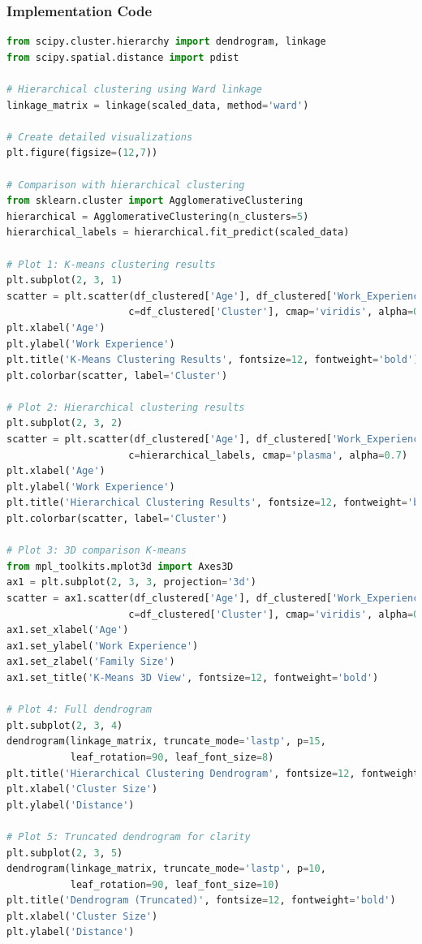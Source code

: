\documentclass[12pt,a4paper]{article}
\begin{document}
\subsubsection{Implementation Code}
\begin{lstlisting}[language=Python, caption=Hierarchical Clustering and Method Comparison]
from scipy.cluster.hierarchy import dendrogram, linkage
from scipy.spatial.distance import pdist

# Hierarchical clustering using Ward linkage
linkage_matrix = linkage(scaled_data, method='ward')

# Create detailed visualizations
plt.figure(figsize=(12,7))

# Comparison with hierarchical clustering
from sklearn.cluster import AgglomerativeClustering
hierarchical = AgglomerativeClustering(n_clusters=5)
hierarchical_labels = hierarchical.fit_predict(scaled_data)

# Plot 1: K-means clustering results
plt.subplot(2, 3, 1)
scatter = plt.scatter(df_clustered['Age'], df_clustered['Work_Experience'], 
                     c=df_clustered['Cluster'], cmap='viridis', alpha=0.7)
plt.xlabel('Age')
plt.ylabel('Work Experience')
plt.title('K-Means Clustering Results', fontsize=12, fontweight='bold')
plt.colorbar(scatter, label='Cluster')

# Plot 2: Hierarchical clustering results
plt.subplot(2, 3, 2)
scatter = plt.scatter(df_clustered['Age'], df_clustered['Work_Experience'], 
                     c=hierarchical_labels, cmap='plasma', alpha=0.7)
plt.xlabel('Age')
plt.ylabel('Work Experience')
plt.title('Hierarchical Clustering Results', fontsize=12, fontweight='bold')
plt.colorbar(scatter, label='Cluster')

# Plot 3: 3D comparison K-means
from mpl_toolkits.mplot3d import Axes3D
ax1 = plt.subplot(2, 3, 3, projection='3d')
scatter = ax1.scatter(df_clustered['Age'], df_clustered['Work_Experience'], df_clustered['Family_Size'],
                     c=df_clustered['Cluster'], cmap='viridis', alpha=0.7)
ax1.set_xlabel('Age')
ax1.set_ylabel('Work Experience')
ax1.set_zlabel('Family Size')
ax1.set_title('K-Means 3D View', fontsize=12, fontweight='bold')

# Plot 4: Full dendrogram
plt.subplot(2, 3, 4)
dendrogram(linkage_matrix, truncate_mode='lastp', p=15, 
           leaf_rotation=90, leaf_font_size=8)
plt.title('Hierarchical Clustering Dendrogram', fontsize=12, fontweight='bold')
plt.xlabel('Cluster Size')
plt.ylabel('Distance')

# Plot 5: Truncated dendrogram for clarity
plt.subplot(2, 3, 5)
dendrogram(linkage_matrix, truncate_mode='lastp', p=10,
           leaf_rotation=90, leaf_font_size=10)
plt.title('Dendrogram (Truncated)', fontsize=12, fontweight='bold')
plt.xlabel('Cluster Size')
plt.ylabel('Distance')


\end{lstlisting}
\end{document}
